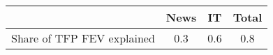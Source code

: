 \begin{small}
	\begin{tabular}{lccc}
	\hline
		& News & IT & Total \\
		\hline
		Share of TFP FEV explained & 0.3 & 0.6 & 0.8 \\
		\hline
	\end{tabular}
\end{small}
